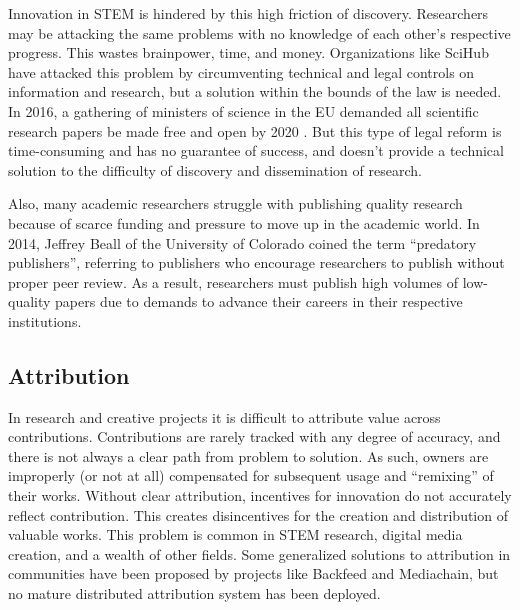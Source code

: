 \documentclass[a4paper, 10pt, conference]{ieeeconf}      %
\begin{document}
Innovation in STEM is hindered by this high friction of discovery. 
Researchers may be attacking the same problems with no knowledge of each other's respective progress. 
This wastes brainpower, time, and money. Organizations like SciHub have attacked this problem by circumventing technical and legal controls on information and research, but a solution within the bounds of the law is needed. 
In 2016, a gathering of ministers of science in the EU demanded all scientific research papers be made free and open by 2020 \cite{khomami2016}. 
But this type of legal reform is time-consuming and has no guarantee of success, and doesn’t provide a technical solution to the difficulty of discovery and dissemination of research.

Also, many academic researchers struggle with publishing quality research because of scarce funding and pressure to move up in the academic world.
In 2014, Jeffrey Beall of the University of Colorado coined the term “predatory publishers”, referring to publishers who encourage researchers to publish without proper peer review\cite{wager2017}.
As a result, researchers must publish high volumes of low-quality papers due to demands to advance their careers in their respective institutions. 

\subsection{Attribution}\label{attribution}
In research and creative projects it is difficult to attribute value across contributions.
Contributions are rarely tracked with any degree of accuracy, and there is not always a clear path from problem to solution. 
As such, owners are improperly (or not at all) compensated for subsequent usage and ``remixing” of their works.
Without clear attribution, incentives for innovation do not accurately reflect contribution. 
This creates disincentives for the creation and distribution of valuable works. 
This problem is common in STEM research, digital media creation, and a wealth of other fields. 
Some generalized solutions to attribution in communities have been proposed by projects like Backfeed and Mediachain, but no mature distributed attribution system has been deployed.
\end{document}
